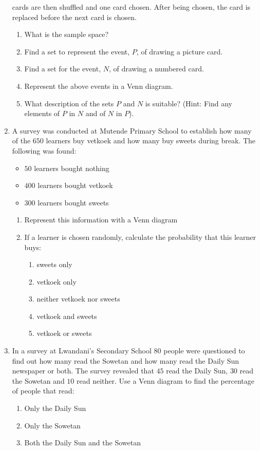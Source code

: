 \begin{eocexercises}{}
\begin{enumerate}[itemsep=5pt, label=\textbf{\arabic*}. ]
    cards are then shuffled and one card chosen. After being chosen,
    the card is replaced before the next card is chosen.
    \begin{enumerate}[noitemsep, label=\textbf{(\alph*)} ]
    \item What is the sample space?
    \item Find a set to represent the event, $P$, of drawing a picture
      card.
    \item Find a set for the event, $N$, of drawing a numbered card.
    \item Represent the above events in a Venn diagram.
    \item What description of the sets $P$ and $N$ is suitable?
      (Hint: Find any elements of $P$ in $N$ and of $N$ in $P$).
    \end{enumerate}
\item A survey was conducted at Mutende Primary School to establish how many of the $650$ learners buy vetkoek and how many buy sweets during break. The following was found:
\begin{itemize}
 \item $50$ learners bought nothing
\item $400$ learners bought vetkoek
\item $300$ learners bought sweets
\end{itemize}
\begin{enumerate}[noitemsep, label=\textbf{(\alph*)} ]
 \item Represent this information with a Venn diagram
\item If a learner is chosen randomly, calculate the probability that this learner buys:
\begin{enumerate}
\item sweets only
\item vetkoek only
\item neither vetkoek nor sweets
\item vetkoek and sweets
\item vetkoek or sweets
\end{enumerate}
\end{enumerate}
\item In a survey at Lwandani's Secondary School $80$ people were questioned to find out how many read the Sowetan and how many read the Daily Sun newspaper or both. The survey revealed that $45$ read the Daily Sun, $30$ read the Sowetan and $10$ read neither. Use a Venn diagram to find the percentage of people that read:
\begin{enumerate}[noitemsep, label=\textbf{(\alph*)} ]
 \item Only the Daily Sun
\item Only the Sowetan
\item Both the Daily Sun and the Sowetan
\end{enumerate}


\end{enumerate}
\end{eocexercises}
